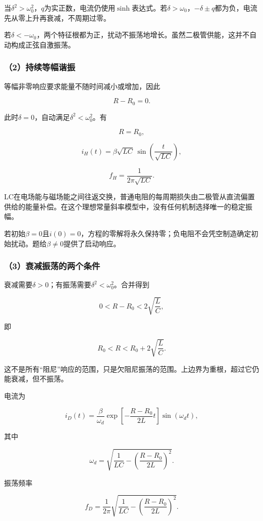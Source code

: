 \documentclass[12pt,a4paper,fontset=fandol]{ctexart}
\begin{document}
当\(\delta^2>\omega_0^2\)，\(q\)为实正数，电流仍使用\(\sinh\)表达式。若\(\delta>\omega_0\)，\(-\delta\pm q\)都为负，电流先从零上升再衰减，不周期过零。

若\(\delta<-\omega_0\)，两个特征根都为正，扰动不振荡地增长。虽然二极管供能，这并不自动构成正弦自激振荡。

\subsubsection{（2）持续等幅谐振}\label{ux6301ux7eedux7b49ux5e45ux8c10ux632f}

等幅非零响应要求能量不随时间减小或增加，因此

\[
R-R_0=0.
\]

此时\(\delta=0\)，自动满足\(\delta^2<\omega_0^2\)。有

\[
\boxed{R=R_0},
\]

\[
\boxed{
i_H(t)=\beta\sqrt{LC}\,
\sin\left(\frac t{\sqrt{LC}}\right)},
\]

\[
\boxed{f_H=\frac1{2\pi\sqrt{LC}}}.
\]

LC在电场能与磁场能之间往返交换，普通电阻的每周期损失由二极管从直流偏置供给的能量补偿。在这个理想常量斜率模型中，没有任何机制选择唯一的稳定振幅。

若初始\(\beta=0\)且\(i(0)=0\)，方程的零解将永久保持零；负电阻不会凭空制造确定初始扰动。题给\(\beta\neq0\)提供了启动响应。

\subsubsection{（3）衰减振荡的两个条件}\label{ux8870ux51cfux632fux8361ux7684ux4e24ux4e2aux6761ux4ef6}

衰减需要\(\delta>0\)；有振荡需要\(\delta^2<\omega_0^2\)。合并得到

\[
0<R-R_0<2\sqrt{\frac LC},
\]

即

\[
\boxed{R_0<R<R_0+2\sqrt{\frac LC}}.
\]

这不是所有``阻尼''响应的范围，只是欠阻尼振荡的范围。上边界为重根，超过它仍能衰减，但不振荡。

电流为

\[
\boxed{
i_D(t)=\frac{\beta}{\omega_d}
\exp\left[-\frac{R-R_0}{2L}t\right]
\sin(\omega_dt)},
\]

其中

\[
\omega_d=
\sqrt{\frac1{LC}-\left(\frac{R-R_0}{2L}\right)^2}.
\]

振荡频率

\[
\boxed{
f_D=\frac1{2\pi}
\sqrt{\frac1{LC}-\left(\frac{R-R_0}{2L}\right)^2}}.
\]
\end{document}
